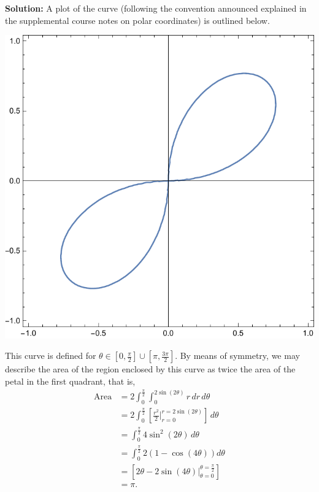 \documentclass[12pt,oneside]{exam}
\newenvironment{newsolution}{\vspace{.1in}\noindent\textbf{Solution: \hspace{.05em}}}{}
\begin{document}
\begin{newsolution}
A plot of the curve (following the convention announced explained in the supplemental course notes on polar coordinates) is outlined below.
\begin{center}
\includegraphics[scale=0.4]{polar_p6.pdf}
\end{center}
This curve is defined for $\theta \in \left[0,\frac{\pi}{2}\right] \cup \left[\pi, \frac{3\pi}{2}\right]$. 
By means of symmetry, we may describe the area of the region enclosed by this curve as twice the area of the petal in the first quadrant, that is,
\begin{align*}
\mathrm{Area} & = 2 \int_{0}^{\frac{\pi}{2}} \int_{0}^{2\sin(2\theta)} r\, dr \, d\theta \\
& = 2\int_{0}^{\frac{\pi}{2}} \left[ \frac{r^2}{2} \Big|_{r=0}^{r=2\sin(2\theta)} \right] \, d\theta \\
& = \int_{0}^{\frac{\pi}{2}} 4\sin^2(2\theta) \, d\theta \\
& = \int_{0}^{\frac{\pi}{2}}2(1-\cos(4\theta))d\theta \\
& = \left[2\theta -2\sin(4\theta) \Big|_{\theta = 0}^{\theta = \frac{\pi}{2}} \right] \\
& = \pi.
\end{align*}
\end{newsolution}
\end{document}
